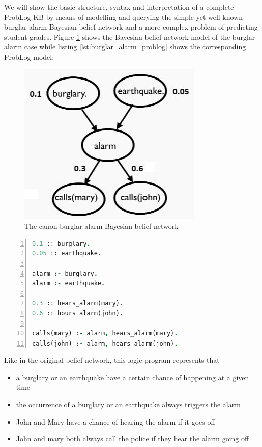 We will show the basic structure, syntax and interpretation of a complete ProbLog KB by means of modelling and querying the simple yet well-known burglar-alarm Bayesian belief network and a more complex problem of predicting student grades. Figure \ref{fig:burglar_alarm_network} shows the Bayesian belief network model of the burglar-alarm case while listing \ref{lst:burglar_alarm_problog} shows the corresponding ProbLog model:
\begin{figure}
  \centering
  \includegraphics[width=0.6\linewidth]{images/burglar_alarm_network.jpg}
  \caption[The canon burglar-alarm Bayesian belief network]{The canon burglar-alarm Bayesian belief network}
  \label{fig:burglar_alarm_network}
\end{figure}

\begin{lstlisting}[language=Prolog, caption={burglar\_alarm.pl, the burglar alarm Bayesian belief network}, numbers=left, label={lst:burglar_alarm_problog}, captionpos=b]
0.1 :: burglary.
0.05 :: earthquake.

alarm :- burglary.
alarm :- earthquake.

0.3 :: hears_alarm(mary).
0.6 :: hours_alarm(john).

calls(mary) :- alarm, hears_alarm(mary).
calls(john) :- alarm, hears_alarm(john).
\end{lstlisting}
Like in the original belief network, this logic program represents that
\begin{itemize}
  \item a burglary or an earthquake have a certain chance of happening at a given time
  \item the occurrence of a burglary or an earthquake always triggers the alarm
  \item John and Mary have a chance of hearing the alarm if it goes off
  \item John and mary both always call the police if they hear the alarm going off
\end{itemize} 

